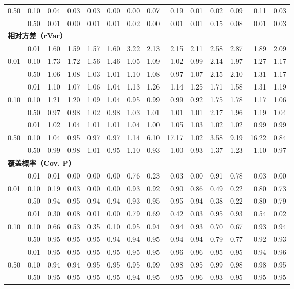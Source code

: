 \begin{longtable}{@{}ccrrrr|rrrr|rrrr@{}}
0.50 & 0.10 & 0.04 & 0.03 & 0.03 & 0.00 & 0.00 & 0.07 & 0.19 & 0.01 & 0.02 & 0.09 & 0.11 & 0.03\\*
 & 0.50 & 0.01 & 0.00 & 0.01 & 0.01 & 0.02 & 0.00 & 0.01 & 0.01 & 0.15 & 0.08 & 0.01 & 0.03\\
\midrule
\multicolumn{14}{l}{\textbf{相对方差（rVar）}}\\*
 & 0.01 & 1.60 & 1.59 & 1.57 & 1.60 & 3.22 & 2.13 & 2.15 & 2.11 & 2.58 & 2.87 & 1.89 & 2.09\\*
0.01 & 0.10 & 1.73 & 1.72 & 1.56 & 1.46 & 1.05 & 1.09 & 1.02 & 0.99 & 2.14 & 1.97 & 1.27 & 1.17\\*
 & 0.50 & 1.06 & 1.08 & 1.03 & 1.01 & 1.10 & 1.08 & 0.97 & 1.07 & 2.15 & 2.10 & 1.31 & 1.17\\*
\cmidrule(l){1-14}
 & 0.01 & 1.10 & 1.07 & 1.06 & 1.04 & 1.13 & 1.26 & 1.14 & 1.25 & 1.71 & 1.58 & 1.31 & 1.19\\*
0.10 & 0.10 & 1.21 & 1.20 & 1.09 & 1.04 & 0.95 & 0.99 & 0.99 & 0.92 & 1.75 & 1.78 & 1.17 & 1.06\\*
 & 0.50 & 0.97 & 0.98 & 1.02 & 0.98 & 1.03 & 1.01 & 1.01 & 1.01 & 2.17 & 1.96 & 1.19 & 1.04\\*
\cmidrule(l){1-14}
 & 0.01 & 1.02 & 1.04 & 1.01 & 1.01 & 1.04 & 1.00 & 1.05 & 1.03 & 1.02 & 1.02 & 0.99 & 0.99\\*
0.50 & 0.10 & 1.04 & 0.95 & 0.97 & 0.97 & 1.14 & 6.10 & 17.17 & 1.02 & 3.58 & 9.19 & 16.22 & 0.84\\*
 & 0.50 & 0.99 & 0.98 & 1.01 & 0.95 & 1.10 & 0.93 & 1.00 & 0.93 & 1.37 & 1.23 & 1.10 & 0.97\\
\midrule
\multicolumn{14}{l}{\textbf{覆盖概率（Cov. P）}}\\*
 & 0.01 & 0.01 & 0.00 & 0.00 & 0.00 & 0.76 & 0.23 & 0.03 & 0.00 & 0.91 & 0.78 & 0.03 & 0.00\\*
0.01 & 0.10 & 0.19 & 0.03 & 0.00 & 0.00 & 0.93 & 0.92 & 0.90 & 0.86 & 0.49 & 0.22 & 0.80 & 0.73\\*
 & 0.50 & 0.94 & 0.95 & 0.94 & 0.94 & 0.93 & 0.95 & 0.95 & 0.94 & 0.38 & 0.22 & 0.80 & 0.79\\*
\cmidrule(l){1-14}
 & 0.01 & 0.30 & 0.08 & 0.01 & 0.00 & 0.79 & 0.69 & 0.42 & 0.03 & 0.95 & 0.93 & 0.54 & 0.02\\*
0.10 & 0.10 & 0.66 & 0.53 & 0.35 & 0.10 & 0.95 & 0.94 & 0.94 & 0.93 & 0.70 & 0.67 & 0.93 & 0.94\\*
 & 0.50 & 0.95 & 0.95 & 0.95 & 0.94 & 0.94 & 0.95 & 0.94 & 0.94 & 0.79 & 0.77 & 0.92 & 0.93\\*
\cmidrule(l){1-14}
 & 0.01 & 0.95 & 0.95 & 0.95 & 0.95 & 0.95 & 0.95 & 0.96 & 0.96 & 0.95 & 0.95 & 0.94 & 0.96\\*
0.50 & 0.10 & 0.94 & 0.94 & 0.95 & 0.95 & 0.95 & 0.99 & 0.98 & 0.95 & 0.99 & 0.98 & 0.98 & 0.95\\*
 & 0.50 & 0.95 & 0.95 & 0.95 & 0.95 & 0.94 & 0.95 & 0.95 & 0.96 & 0.93 & 0.95 & 0.95 & 0.95\\
\end{longtable}
\endgroup
